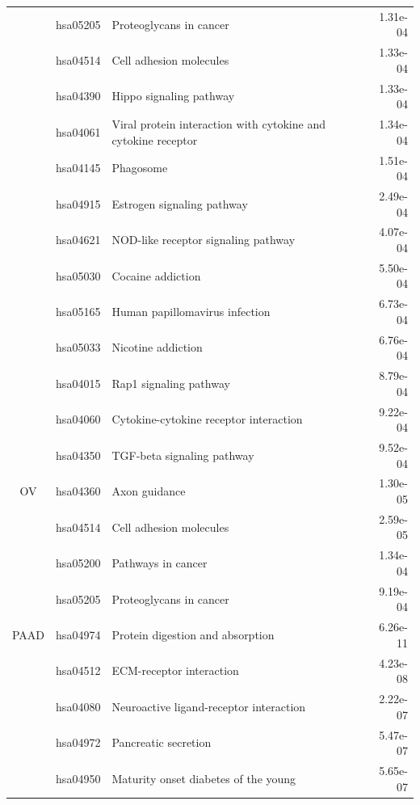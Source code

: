 \begin{longtable}{cllr}
 & hsa05205 & \textcolor{\clrnew}{Proteoglycans in cancer} & 1.31e-04 \\ 
 & hsa04514 & \textcolor{\clrnew}{Cell adhesion molecules} & 1.33e-04 \\ 
 & hsa04390 & \textcolor{\clrnew}{Hippo signaling pathway} & 1.33e-04 \\ 
 & hsa04061 & \textcolor{\clrnew}{Viral protein interaction with cytokine and cytokine receptor} & 1.34e-04 \\ 
 \rowcolor{\clrmatch}& hsa04145 & Phagosome & 1.51e-04 \\ 
 & hsa04915 & \textcolor{\clrnew}{Estrogen signaling pathway} & 2.49e-04 \\ 
 & hsa04621 & \textcolor{\clrnew}{NOD-like receptor signaling pathway} & 4.07e-04 \\ 
 & hsa05030 & \textcolor{\clrnew}{Cocaine addiction} & 5.50e-04 \\ 
 & hsa05165 & \textcolor{\clrnew}{Human papillomavirus infection} & 6.73e-04 \\ 
 & hsa05033 & \textcolor{\clrnew}{Nicotine addiction} & 6.76e-04 \\ 
 & hsa04015 & \textcolor{\clrnew}{Rap1 signaling pathway} & 8.79e-04 \\ 
 & hsa04060 & \textcolor{\clrnew}{Cytokine-cytokine receptor interaction} & 9.22e-04 \\ 
 & hsa04350 & \textcolor{\clrnew}{TGF-beta signaling pathway} & 9.52e-04 \\ 
\midrule 
OV & hsa04360 & \textcolor{\clrnew}{Axon guidance} & 1.30e-05\\  %
 & hsa04514 & \textcolor{\clrnew}{Cell adhesion molecules} & 2.59e-05 \\ 
 & hsa05200 & \textcolor{\clrnew}{Pathways in cancer} & 1.34e-04 \\ 
 & hsa05205 & \textcolor{\clrnew}{Proteoglycans in cancer} & 9.19e-04 \\ 
\midrule 
\rowcolor{\clrmatch}PAAD & hsa04974 & Protein digestion and absorption & 6.26e-11\\ 
 \rowcolor{\clrmatch}& hsa04512 & ECM-receptor interaction & 4.23e-08 \\ 
 & hsa04080 & \textcolor{\clrnew}{Neuroactive ligand-receptor interaction} & 2.22e-07 \\ 
 & hsa04972 & \textcolor{\clrnew}{Pancreatic secretion} & 5.47e-07 \\ 
 \rowcolor{\clrmatch}& hsa04950 & Maturity onset diabetes of the young & 5.65e-07 \\ 

\end{longtable}
